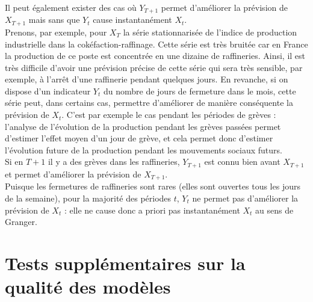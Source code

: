 \documentclass[french]{article}
\begin{document}
Il peut également exister des cas où \(Y_{T+1}\) permet d'améliorer la prévision de \(X_{T+1}\) mais sans que \(Y_t\) cause instantanément \(X_t\).\\
Prenons, par exemple, pour \(X_T\) la série stationnarisée de l'indice de production industrielle dans la cokéfaction-raffinage.
Cette série est très bruitée car en France la production de ce poste est concentrée en une dizaine de raffineries.
Ainsi, il est très difficile d'avoir une prévision précise de cette série qui sera très sensible, par exemple, à l'arrêt d'une raffinerie pendant quelques jours.
En revanche, si on dispose d'un indicateur \(Y_t\) du nombre de jours de fermeture dans le mois, cette série peut, dans certains cas, permettre d'améliorer de manière conséquente la prévision de \(X_t\).
C'est par exemple le cas pendant les périodes de grèves : l'analyse de l'évolution de la production pendant les grèves passées permet d'estimer l'effet moyen d'un jour de grève, et cela permet donc d'estimer l'évolution future de la production pendant les mouvements sociaux futurs.\\
Si en \(T+1\) il y a des grèves dans les raffineries, \(Y_{T+1}\) est connu bien avant \(X_{T+1}\) et permet d'améliorer la prévision de \(X_{T+1}\).\\
Puisque les fermetures de raffineries sont rares (elles sont ouvertes tous les jours de la semaine), pour la majorité des périodes \(t\), \(Y_t\) ne permet pas d'améliorer la prévision de \(X_t\) : elle ne cause donc a priori pas instantanément \(X_t\) au sens de Granger.

\newpage

\hypertarget{appendix-appendix}{%
\appendix}


\setcounter{page}{0}

\hypertarget{sec:qualRes}{%
\section{Tests supplémentaires sur la qualité des modèles}\label{sec:qualRes}}
\end{document}

